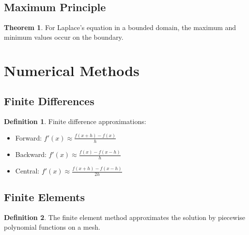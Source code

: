 \documentclass[11pt]{article}
\theoremstyle{definition}
\newtheorem{definition}{Definition}[section]
\newtheorem{theorem}{Theorem}[section]
\begin{document}
\subsection{Maximum Principle}
\begin{theorem}
For Laplace's equation in a bounded domain, the maximum and minimum values occur on the boundary.
\end{theorem}

\section{Numerical Methods}

\subsection{Finite Differences}
\begin{definition}
Finite difference approximations:
\begin{itemize}
    \item Forward: $f'(x) \approx \frac{f(x+h) - f(x)}{h}$
    \item Backward: $f'(x) \approx \frac{f(x) - f(x-h)}{h}$
    \item Central: $f'(x) \approx \frac{f(x+h) - f(x-h)}{2h}$
\end{itemize}
\end{definition}

\subsection{Finite Elements}
\begin{definition}
The finite element method approximates the solution by piecewise polynomial functions on a mesh.
\end{definition}
\end{document}
